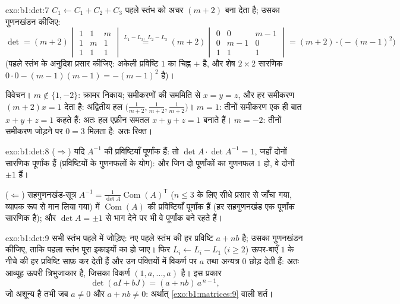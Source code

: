 \begin{solution}{exo:b1:det:7}
$C_1 \leftarrow C_1 + C_2 + C_3$ पहले स्तंभ को अचर $(m+2)$ बना देता है; उसका
गुणनखंडन कीजिए:
\[
\det = (m+2)\begin{vmatrix}
1 & 1 & m\\ 1 & m & 1\\ 1 & 1 & 1
\end{vmatrix}
\overset{L_1 - L_3,\ L_2 - L_3}{=}
(m+2)\begin{vmatrix}
0 & 0 & m-1\\ 0 & m-1 & 0\\ 1 & 1 & 1
\end{vmatrix}
= (m+2)\cdot\bigl(-(m-1)^2\bigr)
\]
(पहले स्तंभ के अनुदिश प्रसार कीजिए: अकेली प्रविष्टि $1$ का चिह्न $+$ है, और
शेष $2 \times 2$ सारणिक $0 \cdot 0 - (m-1)(m-1) = -(m-1)^2$ है)।

विवेचन। $m \notin \{1, -2\}$: क्रामर निकाय; समीकरणों की सममिति से $x = y =
z$, और हर समीकरण $(m + 2)x = 1$ देता है: अद्वितीय हल $\bigl(\frac{1}{m+2},
\frac{1}{m+2}, \frac{1}{m+2}\bigr)$। $m = 1$: तीनों समीकरण एक ही बात $x + y
+ z = 1$ कहते हैं: अतः हल एफ़ीन समतल $x + y + z = 1$ बनाते हैं। $m = -2$:
तीनों समीकरण जोड़ने पर $0 = 3$ मिलता है: अतः  रिक्त।
\end{solution}

\begin{solution}{exo:b1:det:8}
($\Rightarrow$) यदि $A^{-1}$ की प्रविष्टियाँ पूर्णांक हैं: तो $\det A \cdot
\det A^{-1} = 1$, जहाँ दोनों सारणिक पूर्णांक हैं (प्रविष्टियों के गुणनफलों
के योग): और जिन दो पूर्णांकों का गुणनफल $1$ हो, वे दोनों $\pm1$ हैं।

($\Leftarrow$) सहगुणनखंड-सूत्र $A^{-1} = \frac{1}{\det
A}\operatorname{Com}(A)^{\mathsf T}$ ($n \leq 3$ के लिए सीधे प्रसार से जाँचा
गया, व्यापक रूप से मान लिया गया) में $\operatorname{Com}(A)$ की प्रविष्टियाँ
पूर्णांक हैं (हर सहगुणनखंड एक पूर्णांक सारणिक है); और $\det A = \pm 1$ से
भाग देने पर भी वे पूर्णांक बने रहते हैं।
\end{solution}

\begin{solution}{exo:b1:det:9}
सभी स्तंभ पहले में जोड़िए: नए पहले स्तंभ की हर प्रविष्टि $a + nb$ है; उसका
गुणनखंडन कीजिए, ताकि पहला स्तंभ पूरा इकाइयों का हो जाए। फिर  $L_i \leftarrow L_i - L_1$ ($i \geq 2$) ऊपर-बाएँ $1$ के नीचे की
हर प्रविष्टि साफ़ कर देती हैं और उन पंक्तियों में विकर्ण पर $a$ तथा अन्यत्र
$0$ छोड़ देती हैं: अतः आव्यूह ऊपरी त्रिभुजाकार है, जिसका विकर्ण $(1, a,
\dots, a)$ है। इस प्रकार
\[
\det(aI + bJ) = (a + nb)\, a^{\,n-1} ,
\]
जो अशून्य है तभी जब $a \neq 0$ और $a + nb \neq 0$: अर्थात्
\cref{exo:b1:matrices:9} वाली शर्त।
\end{solution}

